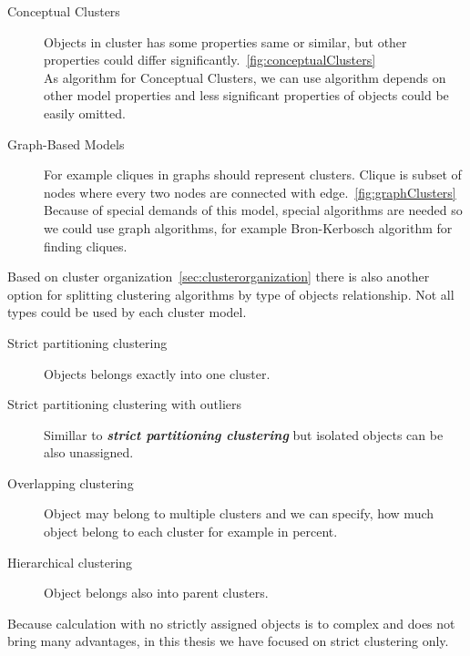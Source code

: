 \begin{description}
\item[Conceptual Clusters] Objects in cluster has some properties same or similar, but other properties could differ significantly.~\autoref{fig:conceptualClusters}\\
As algorithm for Conceptual Clusters, we can use algorithm depends on other model properties and less significant properties of objects could be easily omitted.

\item[Graph-Based Models] For example cliques in graphs should represent clusters. Clique is subset of nodes where every two nodes are connected with edge.~\autoref{fig:graphClusters}\\
Because of special demands of this model, special algorithms are needed so we could use graph algorithms, for example Bron-Kerbosch algorithm for finding cliques. %
\end{description}

Based on cluster organization~\ref{sec:clusterorganization} there is also another option for splitting clustering algorithms by type of objects relationship. Not all types could be used by each cluster model.

\begin{description}
\item[Strict partitioning clustering] Objects belongs exactly into one cluster.
\item[Strict partitioning clustering with outliers] Simillar to \textit{\textbf{strict partitioning clustering}} but isolated objects can be also unassigned. 
\item[Overlapping clustering] Object may belong to multiple clusters and we can specify, how much object belong to each cluster for example in percent.
\item[Hierarchical clustering] Object belongs also into parent clusters.
\end{description}

 Because calculation with no strictly assigned objects is to complex and does not bring many advantages, in this thesis we have focused on strict clustering only.\\
 
